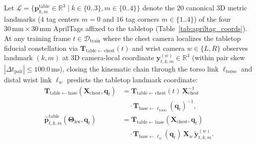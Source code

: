 \documentclass[10pt,journal]{IEEEtran}
\begin{document}
Let $\mathcal{L} = \{\mathbf{p}_{k,m}^{\mathrm{table}} \in \mathbb{R}^3 \mid k \in \{0..3\}, m \in \{0..4\}\}$ denote the $20$ canonical 3D metric landmarks ($4$ tag centers $m=0$ and $16$ tag corners $m \in \{1..4\}$) of the four $30\,\mathrm{mm} \times 30\,\mathrm{mm}$ AprilTags affixed to the tabletop (Table~\ref{tab:apriltag_coords}). At any training frame $t \in \mathcal{D}_{\mathrm{train}}$ where the chest camera localizes the tabletop fiducial constellation via $\mathbf{T}_{\mathrm{table}\leftarrow \mathrm{chest}}(t)$ and wrist camera $w \in \{L, R\}$ observes landmark $(k,m)$ at 3D camera-local coordinate $\mathbf{y}_{t,k,m}^{(w)} \in \mathbb{R}^3$ (within pair skew $|\Delta t_{\mathrm{pair}}| \le 100.0\,\mathrm{ms}$), closing the kinematic chain through the torso link $\ell_{\mathrm{torso}}$ and distal wrist link $\ell_w$ predicts the tabletop landmark coordinate:
\begin{equation}
\begin{aligned}
    \mathbf{T}_{\mathrm{table}\leftarrow \mathrm{base}}(\mathbf{X}_{\mathrm{chest}}, \mathbf{q}_t) &= \mathbf{T}_{\mathrm{table}\leftarrow \mathrm{chest}}(t)\,\mathbf{X}_{\mathrm{chest}}^{-1} \\
    &\quad \cdot \mathbf{T}_{\mathrm{base}\leftarrow \ell_{\mathrm{torso}}}(\mathbf{q}_t)^{-1}, \\
    \hat{\mathbf{p}}_{t,k,m}^{\mathrm{table}}(\boldsymbol{\Theta}_{\mathrm{hw}}, \mathbf{q}_t) &= \mathbf{T}_{\mathrm{table}\leftarrow \mathrm{base}}(\mathbf{X}_{\mathrm{chest}}, \mathbf{q}_t) \\
    &\quad \cdot \mathbf{T}_{\mathrm{base}\leftarrow \ell_w}(\mathbf{q}_t)\,\mathbf{X}_w\,\tilde{\mathbf{y}}_{t,k,m}^{(w)}.
\end{aligned}
\label{eq:loop_closure}
\end{equation}
\end{document}
